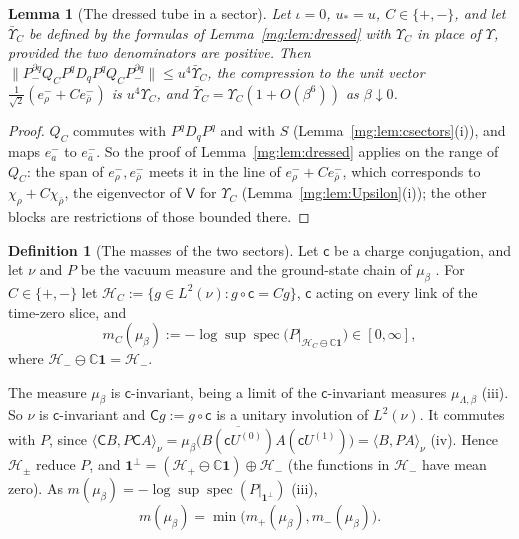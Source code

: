 \documentclass[11pt,a4paper]{article}
\newtheorem{lemma}[theorem]{Lemma}
\theoremstyle{definition}
\newtheorem{definition}[theorem]{Definition}
\theoremstyle{remark}
\DeclareMathOperator{\spec}{spec}
\newcommand{\ip}[2]{\langle #1,#2\rangle}
\newcommand{\C}{\mathbb{C}}
\newcommand{\norm}[1]{\lVert #1\rVert}
\newcommand{\IIlab}[2]{\cite[#1 \texttt{#2}]{II}}
\begin{document}
\begin{lemma}[The dressed tube in a sector]\label{mg:lem:dressedC}
Let $\iota=0$, $u_*=u$, $C\in\{+,-\}$, and let $\bar\Upsilon_C$ be defined by the formulas of Lemma~\ref{mg:lem:dressed} with $\Upsilon_C$ in place of $\Upsilon$,
provided the two denominators are positive. Then $\norm{P^{\partial q}_-Q_CP^qD_qP^qQ_CP^{\partial q}_-}\le u^4\bar\Upsilon_C$, the compression to the unit vector
$\frac1{\sqrt2}(e^-_\rho+Ce^-_{\bar\rho})$ is $u^4\Upsilon_C$, and $\bar\Upsilon_C=\Upsilon_C(1+O(\beta^6))$ as $\beta\downarrow0$.
\end{lemma}

\begin{proof}
$Q_C$ commutes with $P^qD_qP^q$ and with $S$ (Lemma~\ref{mg:lem:csectors}(i)), and maps $e^-_a$ to $e^-_{\bar a}$. So the proof of Lemma~\ref{mg:lem:dressed}
applies on the range of $Q_C$: the span of $e^-_\rho,e^-_{\bar\rho}$ meets it in the line of $e^-_\rho+Ce^-_{\bar\rho}$, which corresponds to
$\chi_\rho+C\chi_{\bar\rho}$, the eigenvector of $\mathsf V$ for $\Upsilon_C$ (Lemma~\ref{mg:lem:Upsilon}(i)); the other blocks are restrictions of those
bounded there.
\end{proof}

\begin{definition}[The masses of the two sectors]\label{mg:def:sectormass}
Let $\mathsf c$ be a charge conjugation, and let $\nu$ and $P$ be the vacuum measure and the ground-state chain of $\mu_\beta$ \IIlab{Corollary}{iv:cor:chain}. For
$C\in\{+,-\}$ let $\mathcal H_C:=\{g\in L^2(\nu):g\circ\mathsf c=Cg\}$, $\mathsf c$ acting on every link of the time-zero slice, and
\[
m_C(\mu_\beta):=-\log\sup\spec\bigl(P|_{\mathcal H_C\ominus\C\mathbf1}\bigr)\in[0,\infty],
\]
where $\mathcal H_-\ominus\C\mathbf1=\mathcal H_-$.
\end{definition}

The measure $\mu_\beta$ is $\mathsf c$-invariant, being a limit of the $\mathsf c$-invariant measures $\mu_{\Lambda,\beta}$ \IIlab{Theorem}{iv:thm:unique}(iii). So $\nu$ is $\mathsf c$-invariant
and $\mathsf Cg:=g\circ\mathsf c$ is a unitary involution of $L^2(\nu)$. It commutes with $P$, since
$\ip{\mathsf CB}{P\mathsf CA}_\nu=\mu_\beta\bigl(\overline{B(\mathsf cU^{(0)})}A(\mathsf cU^{(1)})\bigr)=\ip B{PA}_\nu$ \IIlab{Corollary}{iv:cor:chain}(iv). Hence $\mathcal H_\pm$ reduce
$P$, and $\mathbf1^\perp=(\mathcal H_+\ominus\C\mathbf1)\oplus\mathcal H_-$ (the functions in $\mathcal H_-$ have mean zero). As
$m(\mu_\beta)=-\log\sup\spec(P|_{\mathbf1^\perp})$ \IIlab{Theorem}{iv:thm:gap}(iii),
\[
m(\mu_\beta)=\min\bigl(m_+(\mu_\beta),m_-(\mu_\beta)\bigr).
\]
\end{document}
